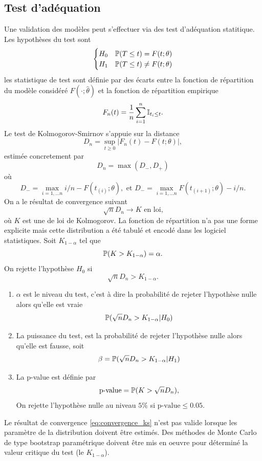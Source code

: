 \subsection{Test d'adéquation}
Une validation des modèles peut s'effectuer via des test d'adéquation statitique. Les hypothèses du test sont 
$$
\begin{cases}
H_0&\mathbb{P}(T\leq t)  = F(t; \theta)\\
H_1&\mathbb{P}(T\leq t)  \neq F(t; \theta)
\end{cases}
$$
les statistique de test sont définie par des écarts entre la fonction de répartition du modèle considéré $F(\cdot ; \hat{\theta})$ et la fonction de répartition empirique 
$$
F_n(t) = \frac{1}{n}\sum_{i=1}^n\mathbb{I}_{t_i\leq t}.
$$
Le test de Kolmogorov-Smirnov s'appuie sur la distance 
$$
D_n = \underset{t\geq 0}{\sup}|F_n(t) - F(t; \theta)|,
$$
estimée concretement par 
$$
D_n=\max(D_-,D_+)
$$
où
$$
D_- =\underset{i = 1,\ldots n}{\max} i/n -F\left(t_{(i)}; \theta\right),\text{ et }D_- =\underset{i = 1,\ldots n}{\max} F\left(t_{(i+1)}; \theta\right) - i/n.
$$ 
On a le résultat de convergence suivant 
\begin{equation}\label{eq:convergence_ks}
\sqrt{n}D_n\overset{}{\rightarrow} K\text{ en loi,}
\end{equation}
où $K$ est une \va de loi de Kolmogorov. La fonction de répartition n'a pas une forme explicite mais cette distribution a été tabulé et encodé dans les logiciel statistiques. Soit $K_{1-\alpha}$ tel que 
$$
\mathbb{P}(K>K_{1-\alpha}) = \alpha.
$$ 
On rejette l'hypothèse $H_0$ si 
$$
\sqrt{n}D_n >K_{1-\alpha}.
$$
\begin{definition}
\begin{enumerate}
	\item $\alpha$ est le niveau du test, c'est à dire la probabilité de rejeter l'hypothèse nulle alors qu'elle est vraie
	$$
	\mathbb{P}(\sqrt{n}D_n>K_{1-\alpha}|H_0)
	$$
	\item La puissance du test, est la probabilité de rejeter l'hypothèse nulle alors qu'elle est fausse, soit 
	$$
	\beta = \mathbb{P}(\sqrt{n}D_n >  K_{1-\alpha}|H_1)
	$$
	\item La p-value est définie par  
	$$
	\text{p-value} = \mathbb{P}(K > \sqrt{n}D_n),
	$$
	On rejette l'hypothèse nulle au niveau $5\%$ si $\text{p-value} \leq 0.05$.
\end{enumerate}
\end{definition}
\begin{remark}
Le résultat de convergence \eqref{eq:convergence_ks} n'est pas valide lorsque les paramètre de la distribution doivent être estimés. Des méthodes de Monte Carlo de type bootstrap paramétrique doivent être mis en oeuvre pour déterminé la valeur critique du test (le $K_{1-\alpha}$).
\end{remark}





